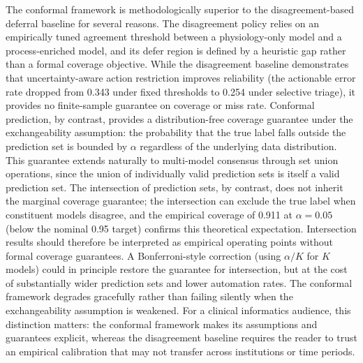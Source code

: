 The conformal framework is methodologically superior to the disagreement-based deferral baseline for several reasons. The disagreement policy relies on an empirically tuned agreement threshold between a physiology-only model and a process-enriched model, and its defer region is defined by a heuristic gap rather than a formal coverage objective. While the disagreement baseline demonstrates that uncertainty-aware action restriction improves reliability (the actionable error rate dropped from 0.343 under fixed thresholds to 0.254 under selective triage), it provides no finite-sample guarantee on coverage or miss rate. Conformal prediction, by contrast, provides a distribution-free coverage guarantee under the exchangeability assumption: the probability that the true label falls outside the prediction set is bounded by $\alpha$ regardless of the underlying data distribution.\cite{Vovk2005} This guarantee extends naturally to multi-model consensus through set union operations, since the union of individually valid prediction sets is itself a valid prediction set. The intersection of prediction sets, by contrast, does not inherit the marginal coverage guarantee; the intersection can exclude the true label when constituent models disagree, and the empirical coverage of 0.911 at $\alpha = 0.05$ (below the nominal 0.95 target) confirms this theoretical expectation. Intersection results should therefore be interpreted as empirical operating points without formal coverage guarantees. A Bonferroni-style correction (using $\alpha/K$ for $K$ models) could in principle restore the guarantee for intersection, but at the cost of substantially wider prediction sets and lower automation rates. The conformal framework degrades gracefully rather than failing silently when the exchangeability assumption is weakened. For a clinical informatics audience, this distinction matters: the conformal framework makes its assumptions and guarantees explicit, whereas the disagreement baseline requires the reader to trust an empirical calibration that may not transfer across institutions or time periods.

